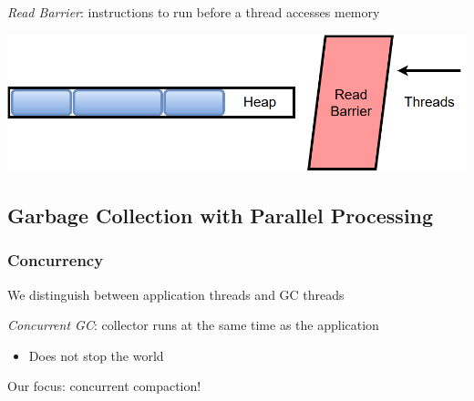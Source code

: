 \documentclass{beamer}
\newcommand{\linespace}{\vskip 0.25cm}
\begin{document}
\begin{frame}
{%
\emph{Read Barrier}: instructions to run before a thread accesses memory

\linespace
\linespace
\linespace

\begin{center}
\includegraphics[width=.70\textwidth]{Illustrations/read_barrier.png}
\end{center}

}

\end{frame}



\subsection[GC with PP]{Garbage Collection with Parallel Processing}

\begin{frame}

\frametitle{Concurrency}

We distinguish between application threads and GC threads

\linespace
\linespace

\emph{Concurrent GC}: collector runs at the same time as the application
\begin{itemize}
\item Does not stop the world
\end{itemize}

\linespace
\linespace

Our focus: concurrent compaction!

\end{frame}

%
%
%
%
%
%
%
%
\end{document}
